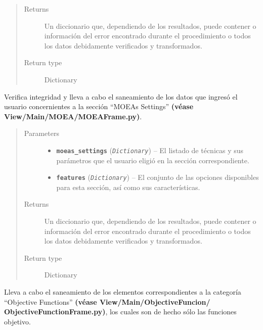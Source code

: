 \documentclass[class=report, crop=false]{standalone}
\begin{document}
\begin{fulllineitems}
\begin{fulllineitems}
\begin{quote}
\begin{description}
\item[{Returns}] \leavevmode
Un diccionario que, dependiendo de los resultados, puede contener
o información del error encontrado durante el procedimiento o 
todos los datos debidamente verificados y transformados.
\item[{Return type}] \leavevmode
Dictionary
\end{description}\end{quote}

\end{fulllineitems}

\begin{fulllineitems}

Verifica integridad y lleva a cabo el saneamiento de 
los datos que ingresó el usuario concernientes a la 
sección ``MOEAs Settings'' \textbf{(véase View/Main/}\break\textbf{MOEA/MOEAFrame.py)}.

\begin{quote}\begin{description}
\item[{Parameters}] \leavevmode\begin{itemize}
\item \textbf{\texttt{moeas\_settings}} (\emph{\texttt{Dictionary}}) -- El listado de técnicas y sus parámetros que el usuario eligió en la sección correspondiente.
\item \textbf{\texttt{features}} (\emph{\texttt{Dictionary}}) -- El conjunto de las opciones disponibles para esta sección, así como sus características.
\end{itemize}

\item[{Returns}] \leavevmode
Un diccionario que, dependiendo de los resultados, puede contener
o información del error encontrado durante el procedimiento o 
todos los datos debidamente verificados y transformados.
\item[{Return type}] \leavevmode
Dictionary
\end{description}\end{quote}

\end{fulllineitems}

\begin{fulllineitems}

Lleva a cabo el saneamiento de los elementos correspondientes a la categoría
``Objective Functions'' \textbf{(véase View/Main/ObjectiveFuncion/}\break
\textbf{ObjectiveFunctionFrame.py)}, los cuales son de hecho sólo 
las funciones objetivo.


\end{fulllineitems}
\end{fulllineitems}
\end{document}
